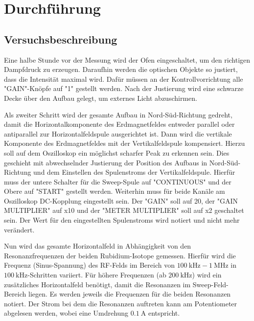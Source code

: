 \section{Durchführung}
\label{sec:Durchführung}



\subsection{Versuchsbeschreibung}
\label{sec:Versuchsbeschreibung}

Eine halbe Stunde vor der Messung wird der Ofen eingeschaltet, um den richtigen
Dampfdruck zu erzeugen.
Daraufhin werden die optischen Objekte so justiert, dass die Intensität maximal wird.
Dafür müssen an der Kontrollvorrichtung alle "GAIN"-Knöpfe auf "1" gestellt werden.
Nach der Justierung wird eine schwarze Decke über den Aufbau gelegt, um externes Licht
abzuschirmen.

Als zweiter Schritt wird der gesamte Aufbau in Nord-Süd-Richtung gedreht, damit
die Horizontalkomponente des Erdmagnetfeldes entweder parallel oder antiparallel
zur Horizontalfeldspule ausgerichtet ist.
Dann wird die vertikale Komponente des Erdmagnetfeldes mit der Vertikalfeldspule
kompensiert. Hierzu soll auf dem Oszilloskop ein möglichst scharfer Peak zu erkennen sein.
Dies geschieht mit abwechselnder Justierung der Position des Aufbaus in Nord-Süd-Richtung und
dem Einstellen des Spulenstroms der Vertikalfeldspule.
Hierfür muss der untere Schalter für die Sweep-Spule auf "CONTINUOUS" und der Obere
auf "START" gestellt werden. Weiterhin muss für beide Kanäle am Oszilloskop DC-Kopplung
eingestellt sein. Der "GAIN" soll auf 20, der "GAIN MULTIPLIER" auf x10 und der "METER
MULTIPLIER" soll auf x2 geschaltet sein. Der Wert für den eingestellten Spulenstroms
wird notiert und nicht mehr verändert.

Nun wird das gesamte Horizontalfeld in Abhängigkeit von den Resonanzfrequenzen der beiden
Rubidium-Isotope gemessen. Hierfür wird die Frequenz (Sinus-Spannung) des RF-Felds im Bereich
von $\SI{100}{\kilo\hertz}-\SI{1}{\mega\hertz}$ in $\SI{100}{\kilo\hertz}$-Schritten
variiert.
Für höhere Frequenzen (ab $\SI{200}{\kilo\hertz}$) wird ein zusätzliches Horizontalfeld
benötigt, damit die Resonanzen im Sweep-Feld-Bereich liegen.
Es werden jeweils die Frequenzen für die beiden Resonanzen notiert. Der Strom bei dem
die Resonanzen auftreten kann am Potentiometer abgelesen werden, wobei eine Umdrehung
$\SI{0,1}{\ampere}$ entspricht.
